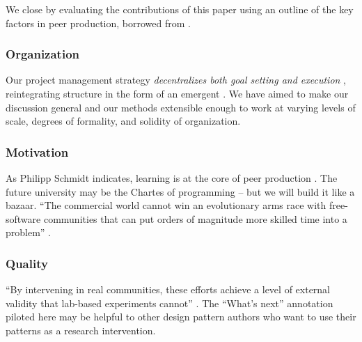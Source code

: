 
We close by evaluating the contributions of this paper using an
outline of the key factors in peer production, borrowed from
\cite{benkler2015peer}.

\vspace{-.25\baselineskip}

\subsubsection*{Organization} 
Our project management strategy \emph{decentralizes both goal setting
  and execution} \cite{benkler2015peer}, reintegrating structure in
the form of an emergent .  We have aimed to make
our discussion general and our methods extensible enough to work at
varying levels of scale, degrees of formality, and solidity of
organization.

\vspace{-.25\baselineskip}

\subsubsection*{Motivation}  As Philipp Schmidt indicates, learning
is at the core of peer production \cite{schmidt+commons-based+2009}.  The future university may be the
Chartes of programming -- but we will build it like a bazaar. ``The
commercial world cannot win an evolutionary arms race with
free-software communities that can put orders of magnitude more
skilled time into a problem'' \cite{raymond2001cathedral}.

\vspace{-.25\baselineskip}

\subsubsection*{Quality} 
``By intervening in real communities, these efforts achieve a level of
external validity that lab-based experiments cannot'' \cite{benkler2015peer}.
The ``What's next'' annotation piloted here may be helpful to other
design pattern authors who want to use their patterns as a research intervention.



